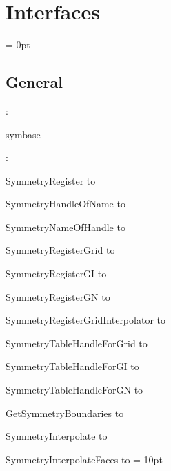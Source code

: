 
\section{Interfaces} 


\parskip = 0pt

\vspace{3mm} \subsection*{General}

: 

symbase
\vspace{2mm}

\vspace{5mm}

: 



SymmetryRegister to 

SymmetryHandleOfName to 

SymmetryNameOfHandle to 

SymmetryRegisterGrid to 

SymmetryRegisterGI to 

SymmetryRegisterGN to 

SymmetryRegisterGridInterpolator to 

SymmetryTableHandleForGrid to 

SymmetryTableHandleForGI to 

SymmetryTableHandleForGN to 

GetSymmetryBoundaries to 

SymmetryInterpolate to 

SymmetryInterpolateFaces to 
\vspace{2mm}\parskip = 10pt 
